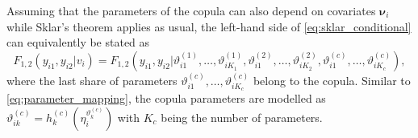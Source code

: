 Assuming that the parameters of the copula can also depend on covariates $\bm{\nu}_i$ while Sklar's theorem applies as usual, the left-hand side of \autoref{eq:sklar_conditional} can equivalently be stated as  
$$
F_{1,2}(y_{i 1}, y_{i 2} | v_{i})= F_{1,2}(y_{i 1}, y_{i 2} | \vartheta_{i 1}^{(1)}, \ldots, \vartheta_{i K_{1}}^{(1)}, \vartheta_{i 1}^{(2)}, \ldots,
\vartheta_{i K_{2}}^{(2)}, \vartheta_{i 1}^{(c)}, \ldots, \vartheta_{i K_{c}}^{(c)}),
$$
where the last share of parameters $\vartheta_{i 1}^{(c)}, \ldots, \vartheta_{i K_{c}}^{(c)}$ belong to the copula. Similar to \autoref{eq:parameter_mapping}, the copula parameters are modelled as $\vartheta_{i k}^{(c)}=h_{k}^{(c)}(\eta_{i}^{\vartheta_{k}^{(c)}})$ with $K_c$ being the number of parameters.













